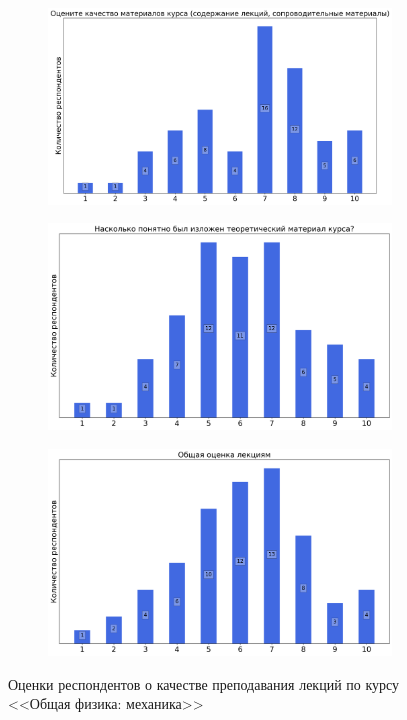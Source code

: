 \begin{figure}[H]
\begin{subfigure}[b]{0.45\textwidth}
			\end{subfigure}
			\begin{subfigure}[b]{0.45\textwidth}
				\centering
				\includegraphics[width=\textwidth]{images/1 course/Общая физика - механика/lecturer-marks-Холин Д.И.-1.png}
			\end{subfigure}
			\begin{subfigure}[b]{0.45\textwidth}
				\centering
				\includegraphics[width=\textwidth]{images/1 course/Общая физика - механика/lecturer-marks-Холин Д.И.-2.png}
			\end{subfigure}	
			\begin{subfigure}[b]{0.45\textwidth}
				\centering
				\includegraphics[width=\textwidth]{images/1 course/Общая физика - механика/lecturer-marks-Холин Д.И.-3.png}
			\end{subfigure}
			\caption{Оценки респондентов о качестве преподавания лекций по курсу <<Общая физика: механика>>}
		\end{figure}

